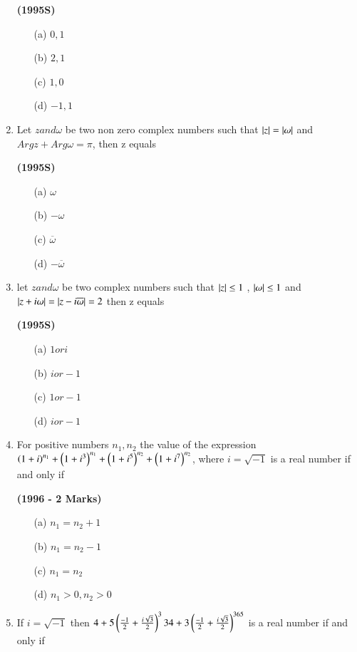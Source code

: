 \documentclass[journal,12pt,twocolumn]{IEEEtran}
\theoremstyle{remark}
\begin{document}
\begin{enumerate}[start=6]
\hfill{\textbf{(1995S)}}

\begin{enumerate}
\item[(a)]$0,1$
\item[(b)]$2,1$
\item[(c)]$1,0$
\item[(d)]$-1,1$
\end{enumerate}
\item Let $z and \omega$ be two non zero complex numbers such that $\left\vert z\right\vert=\left\vert\omega\right\vert$ and $Argz+Arg\omega=\pi$, then z equals 

\hfill{\textbf{(1995S)}}

\begin{enumerate}
\item[(a)]$\omega$
\item[(b)]$-\omega$
\item[(c)]$\overline{\omega}$
\item[(d)]$-\overline{\omega}$
\end{enumerate}
\item let $z and \omega$ be two complex numbers such that $\left\vert z\right\vert\leq1$ , $\left\vert\omega\right\vert\leq1$ and $\left\vert z+i\omega\right\vert=\left\vert z-i\overline{\omega}\right\vert=2$ then z equals 

\hfill{\textbf{(1995S)}}

\begin{enumerate}
\item[(a)]$1 or i$
\item[(b)]$i or -1$
\item[(c)]$1 or -1$
\item[(d)]$i or -1$
\end{enumerate}
\item For positive numbers $n_1,n_2$ the value of the expression $\left(1+i\right)^{n_1}+\left(1+i^3\right)^{n_1}+\left(1+i^5\right)^{n_2}+\left(1+i^7\right)^{n_2}$, where $i=\sqrt{-1}$ is a real number if and only if

\hfill{\textbf{(1996 - 2 Marks)}}

\begin{enumerate}
\item[(a)]$n_1=n_2+1$
\item[(b)]$n_1=n_2-1$
\item[(c)]$n_1=n_2$
\item[(d)]$n_1>0,n_2>0$
\end{enumerate}
\item If $i=\sqrt{-1}$ then $4+5\left(\frac{-1}{2}+\frac{i\sqrt{3}}{2}\right)^334 + 3\left(\frac{-1}{2}+\frac{i\sqrt{3}}{2}\right)^{365}$ is a real number if and only if 


\end{enumerate}
\end{document}
